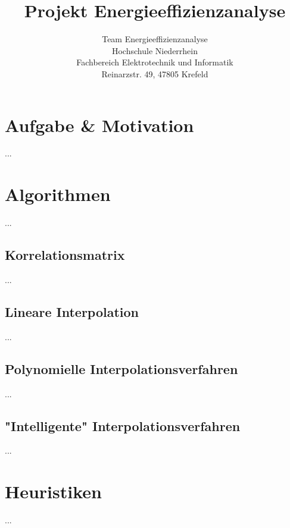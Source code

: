 \documentclass[11pt,a4paper,twocolumn]{article}
\title{\vspace*{-10mm}Projekt Energieeffizienzanalyse}
\author{
Team Energieeffizienzanalyse\\
Hochschule Niederrhein\\
Fachbereich Elektrotechnik und Informatik\\
Reinarzstr. 49, 47805 Krefeld
}
\date{}
\begin{document}
\renewcommand{\labelenumi}{\arabic{enumi})}


\thispagestyle{firstpage}

\section{Aufgabe \& Motivation}
...

\section{Algorithmen}
...

\subsection{Korrelationsmatrix}
...



\subsection{Lineare Interpolation}
...

\subsection{Polynomielle Interpolationsverfahren}
...

\subsection{"Intelligente" Interpolationsverfahren}
...

\section{Heuristiken}
...
\end{document}
